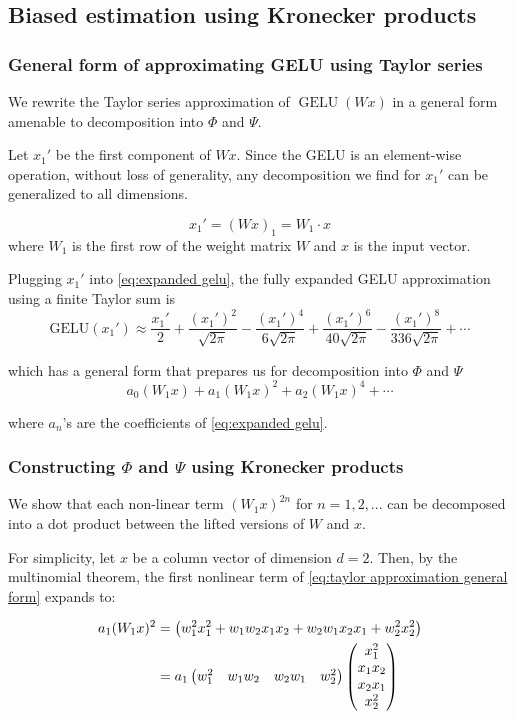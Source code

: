 \documentclass{article}
\begin{document}
\subsection{Biased estimation using Kronecker products}

\subsubsection{General form of approximating GELU using Taylor series}

We rewrite the Taylor series approximation of $\operatorname{GELU}(Wx)$ in a general form amenable to decomposition into $\Phi$ and $\Psi$.

Let $x_1'$ be the first component of $Wx$. Since the GELU is an element-wise operation, without loss of generality, any decomposition we find for $x_1'$ can be generalized to all dimensions.

\[
x_1' = (Wx)_1= W_1 \cdot x
\]
where $W_1$ is the first row of the weight matrix $W$ and $x$ is the input vector. 

Plugging $x_1'$ into \eqref{eq:expanded gelu}, the fully expanded GELU approximation using a finite Taylor sum is
\[
\text{GELU}(x_1') \approx \frac{x_1'}{2} + \frac{(x_1')^2}{\sqrt{2\pi}} - \frac{(x_1')^4}{6\sqrt{2\pi}} + \frac{(x_1')^6}{40\sqrt{2\pi}} - \frac{(x_1')^8}{336\sqrt{2\pi}} + \cdots
\]

which has a general form that prepares us for decomposition into $\Phi$ and $\Psi$
\begin{equation}
    a_0 (W_1 x) + a_1 (W_1 x)^2 + a_2 (W_1 x)^4 + \cdots
    \label{eq:taylor approximation general form}
\end{equation}

where $a_n$'s are the coefficients of \eqref{eq:expanded gelu}.

\subsubsection{Constructing $\Phi$ and $\Psi$ using Kronecker products}\label{subsec:general forms}

We show that each non-linear term $(W_1 x)^{2n}$ for $n=1,2,...$ can be decomposed into a dot product between the lifted versions of $W$ and $x$.

For simplicity, let $x$ be a column vector of dimension $d=2$. Then, by the multinomial theorem, the first nonlinear term of \eqref{eq:taylor approximation general form} expands to:

\begin{align}
a_1 (W_1 x)^2 
&= \left( w_1^2 x_1^2 + w_1 w_2 x_1 x_2 + w_2 w_1 x_2 x_1 + w_2^2 x_2^2 \right) \notag \\
&= a_1 \begin{pmatrix}
w_1^2 & w_1 w_2 & w_2 w_1 & w_2^2
\end{pmatrix}
\begin{pmatrix}
x_1^2 \\
x_1 x_2 \\
x_2 x_1 \\
x_2^2
\end{pmatrix}
\label{eq:multinomial expansion linear combination}
\end{align}
\end{document}

